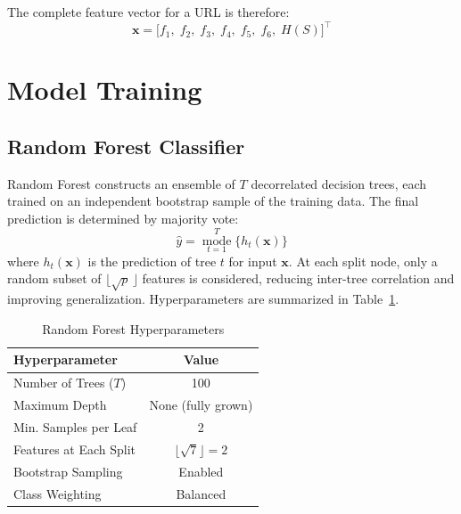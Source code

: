 \documentclass[conference]{IEEEtran}
\begin{document}
\vspace{4pt}
The complete feature vector for a URL is therefore:
\begin{equation}
    \mathbf{x} = \bigl[f_1,\; f_2,\; f_3,\; f_4,\; 
                         f_5,\; f_6,\; H(S)\bigr]^{\top}
    \label{eq:fvec}
\end{equation}

\section{Model Training}
\label{sec:training}

\subsection{Random Forest Classifier}

Random Forest constructs an ensemble of $T$ decorrelated decision 
trees, each trained on an independent bootstrap sample of the 
training data. The final prediction is determined by majority vote:
\begin{equation}
    \hat{y} = \operatorname*{mode}_{t=1}^{T}
              \bigl\{h_t(\mathbf{x})\bigr\}
    \label{eq:rf}
\end{equation}
where $h_t(\mathbf{x})$ is the prediction of tree $t$ for input 
$\mathbf{x}$. At each split node, only a random subset of 
$\lfloor\sqrt{p}\,\rfloor$ features is considered, reducing 
inter-tree correlation and improving generalization. 
Hyperparameters are summarized in Table~\ref{tab:rfparams}.

\begin{table}[htbp]
\caption{Random Forest Hyperparameters}
\label{tab:rfparams}
\centering
\renewcommand{\arraystretch}{1.2}
\begin{tabular}{lc}
\toprule
\textbf{Hyperparameter} & \textbf{Value} \\
\midrule
Number of Trees ($T$)         & 100 \\
Maximum Depth                 & None (fully grown) \\
Min. Samples per Leaf         & 2 \\
Features at Each Split        & $\lfloor\sqrt{7}\rfloor = 2$ \\
Bootstrap Sampling            & Enabled \\
Class Weighting               & Balanced \\
\bottomrule
\end{tabular}
\end{table}
\end{document}
